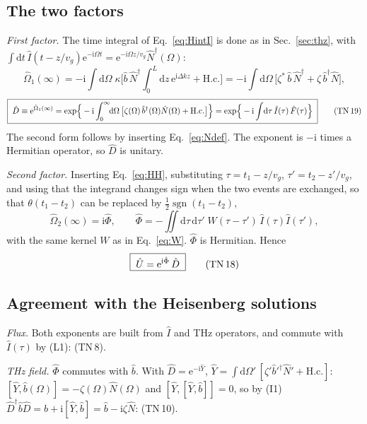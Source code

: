 \documentclass[aps,pra,onecolumn,notitlepage,11pt,amsmath,amssymb,nofootinbib]{revtex4-2}
\newcommand{\Nop}{\hat N}
\newcommand{\Iop}{\hat I}
\newcommand{\dd}{\mathrm{d}}
\newcommand{\ee}{\mathrm{e}}
\newcommand{\ii}{\mathrm{i}}
\newcommand{\sgn}{\operatorname{sgn}}
\newcommand{\TN}[1]{\text{TN\,#1}}
\begin{document}
\subsection{The two factors}

\emph{First factor.} The time integral of Eq.~\eqref{eq:HintI} is done as in
Sec.~\ref{sec:thz}, with
$\int\dd t\,\Iop(t-z/v_g)\ee^{-\ii\Omega t}=\ee^{-\ii\Omega z/v_g}\Nop^\dagger(\Omega)$:
\begin{equation}
\hat\Omega_1(\infty)=-\ii\int\!\dd\Omega\;\kappa\Big[\hat b\,\Nop^\dagger\int_0^L\!\!\dd z\,\ee^{\ii\Delta kz}
+\mathrm{H.c.}\Big]
=-\ii\int\!\dd\Omega\,\Big[\zeta^*\,\hat b\,\Nop^\dagger+\zeta\,\hat b^\dagger\Nop\Big],
\end{equation}
\begin{equation}
\boxed{\;\hat D\equiv\ee^{\hat\Omega_1(\infty)}
=\exp\!\Big\{-\ii\int_0^\infty\!\!\dd\Omega\,
\big[\zeta(\Omega)\,\hat b^\dagger(\Omega)\Nop(\Omega)+\mathrm{H.c.}\big]\Big\}
=\exp\!\Big\{-\ii\int\!\dd\tau\,\Iop(\tau)\,\hat F(\tau)\Big\}\;}
\tag{\TN{19}}
\end{equation}
The second form follows by inserting Eq.~\eqref{eq:Ndef}. The exponent is
$-\ii$ times a Hermitian operator, so $\hat D$ is unitary.

\emph{Second factor.} Inserting Eq.~\eqref{eq:HH}, substituting
$\tau=t_1-z/v_g$, $\tau'=t_2-z'/v_g$, and using that the integrand changes
sign when the two events are exchanged, so that
$\theta(t_1-t_2)$ can be replaced by $\tfrac12\sgn(t_1-t_2)$,
\begin{equation}
\hat\Omega_2(\infty)=\ii\hat\Phi,\qquad
\hat\Phi=-\iint\!\dd\tau\,\dd\tau'\;W(\tau-\tau')\,\Iop(\tau)\Iop(\tau'),
\label{eq:Phi}
\end{equation}
with the same kernel $W$ as in Eq.~\eqref{eq:W}. $\hat\Phi$ is Hermitian.
Hence
\begin{equation}
\boxed{\;\hat U=\ee^{\ii\hat\Phi}\,\hat D\;}
\tag{\TN{18}}
\end{equation}

\subsection{Agreement with the Heisenberg solutions}

\emph{Flux.} Both exponents are built from $\Iop$ and THz operators, and
commute with $\Iop(\tau)$ by (L1): (TN\,8).

\emph{THz field.} $\hat\Phi$ commutes with $\hat b$. With
$\hat D=\ee^{-\ii\hat Y}$,
$\hat Y=\int\dd\Omega'\,[\zeta'\hat b'^\dagger\Nop'+\mathrm{H.c.}]$:
$[\hat Y,\hat b(\Omega)]=-\zeta(\Omega)\Nop(\Omega)$ and
$[\hat Y,[\hat Y,\hat b]]=0$, so by (I1)
$\hat D^\dagger\hat b\hat D=\hat b+\ii[\hat Y,\hat b]=\hat b-\ii\zeta\Nop$:
(TN\,10).
\end{document}
